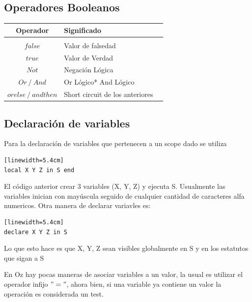 \documentclass[10pt,journal,compsoc]{IEEEtran}
\begin{document}
\subsection{Operadores Booleanos}
\begin{tabular}{c p{3cm} p{5cm}}
	Operador & Significado\\
	\hline\hline\\
	$false$ & Valor de falsedad\\
	$true$ & Valor de Verdad\\
	$Not$ & Negaci\'on L\'ogica\\
	$Or~/~And$ & Or L\'ogico* And L\'ogico\\
	$orelse~/~andthen$ & Short circuit de los anteriores\\
	\hline
\end{tabular}
\subsection{Declaraci\'on de variables}
Para la declaraci\'on de variables que pertenecen a un scope dado se utiliza
\begin{lstlisting}[language=Oz, caption = {Variables en un scope}][linewidth=5.4cm]
local X Y Z in S end
\end{lstlisting}
El c\'odigo anterior crear 3 variables (X, Y, Z) y ejecuta S. Usualmente las variables inician con may\'uscula seguido de cualquier cantidad de caracteres alfa numericos. Otra manera de declarar variavles es:
\begin{lstlisting}[language=Oz, caption = {Variables en un scope}][linewidth=5.4cm]
declare X Y Z in S
\end{lstlisting}
Lo que esto hace es que X, Y, Z sean visibles globalmente en S y en los estatutos que sigan a S
\par En Oz hay pocas maneras de asociar variables a un valor, la usual es utilizar el operador infijo $"="$, ahora bien, si una variable ya contiene un valor la operaci\'on es considerada un test.
\end{document}
